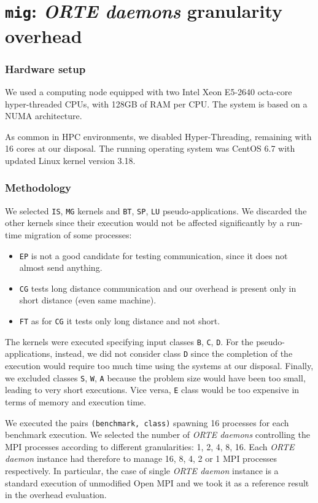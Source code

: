 \section{\texttt{mig}: \emph{ORTE daemons} granularity overhead}

\subsubsection{Hardware setup}
We used a computing node equipped with two Intel Xeon E5-2640 octa-core
hyper-threaded CPUs, with 128GB of RAM per CPU. The system is based on a NUMA
architecture.

As common in HPC environments, we disabled Hyper-Threading, remaining with
16 cores at our disposal. The running operating system was CentOS 6.7 with
updated Linux kernel version 3.18.

\subsubsection{Methodology}
We selected \texttt{IS}, \texttt{MG} kernels and \texttt{BT}, \texttt{SP},
\texttt{LU} pseudo-applications. We discarded the other kernels since their
execution would not be affected significantly by a run-time migration of
some processes:
\begin{itemize}
\item \texttt{EP} is not a good candidate for testing communication, since it
      does not almost send anything. 
\item \texttt{CG} tests long distance communication and our overhead is 
      present only in short distance (even same machine).
\item \texttt{FT} as for \texttt{CG} it tests only long distance and not short.
\end{itemize}


The kernels were executed specifying input classes \texttt{B}, \texttt{C},
\texttt{D}. For the pseudo-applications, instead, we did not
consider class
\texttt{D} since the completion of the execution would require too much time
using the systems at our disposal.
Finally, we excluded classes \texttt{S}, \texttt{W}, \texttt{A} because the problem size would have
been too small, leading to very short executions. Vice versa, \texttt{E} class
would be too expensive in terms of memory and execution time.

We executed the pairs \texttt{(benchmark, class)} spawning 16 processes for each
benchmark execution. We selected the number of \emph{ORTE daemons} controlling the
MPI processes according to different granularities: 1, 2, 4, 8, 16.
Each \emph{ORTE daemon} instance had therefore to manage 16, 8, 4, 2 or 1 MPI
processes respectively. In particular, the case of single \emph{ORTE daemon} instance
is a standard execution of unmodified Open MPI and we took it as a reference
result in the overhead evaluation.

